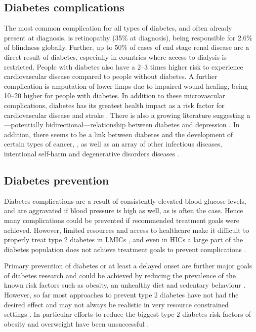 \subsection{Diabetes complications}

The most common complication for all types of diabetes, and often already present at diagnosis, is retinopathy (35\% at diagnosis), being responsible for 2.6\% of blindness globally. Further, up to 50\% of cases of end stage renal disease are a direct result of diabetes, especially in countries where access to dialysis is restricted. People with diabetes also have a 2--3 times higher risk to experience cardiovascular disease compared to people without diabetes. A further complication is amputation of lower limps due to impaired wound healing, being 10--20 higher for people with diabetes. In addition to these microvascular complications, diabetes has its greatest health impact as a risk factor for cardiovascular disease and stroke \parencite{WorldHealthOrganization2016}. There is also a growing literature suggesting a---potentially bidirectional---relationship between diabetes and depression \parencite{VanDooren2013,Nouwen2010,Roy2012}. In addition, there seems to be a link between diabetes and the development of certain types of cancer, \parencite{Tsilidis2015,Nead2015}, as well as an array of other infectious diseases, intentional self-harm and degenerative disorders diseases \parencite{Seshasai2011}.


\subsection{Diabetes prevention}

Diabetes complications are a result of consistently elevated blood glucose levels, and  are aggravated if blood pressure is high as well, as is often the case. Hence many complications could be prevented if recommended treatment goals were achieved. However, limited resources and access to healthcare make it difficult to properly treat type 2 diabetes in \acp{LMIC} \parencite{Villalpando2010}, and even in \acp{HIC} a large part of the diabetes population does not achieve treatment goals to prevent complications \parencite{DiabetesUK2012}. 

Primary prevention of diabetes or at least a delayed onset are further major goals of diabetes research and could be achieved by reducing the prevalence of the known risk factors such as obesity, an unhealthy diet and sedentary behaviour \parencite{WorldHealthOrganization2016}. However, so far most approaches to prevent type 2 diabetes have not had the desired effect and may not always be realistic in very resource constrained settings \parencite{White2016}. In particular efforts to reduce the biggest type 2 diabetes risk factors of obesity and overweight have been unsuccessful \parencite{Roberto2015}.

